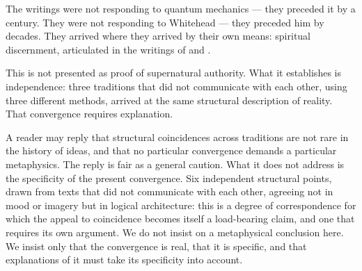 
The \bahai writings were not responding to quantum mechanics --- they
preceded it by a century.
They were not responding to Whitehead --- they preceded him by decades.
They arrived where they arrived by their own means: spiritual discernment,
articulated in the writings of \Bahaullah and \AbdulBaha.

This is not presented as proof of supernatural authority.
What it establishes is independence: three traditions that did not communicate
with each other, using three different methods, arrived at the same structural
description of reality.
That convergence requires explanation.

A reader may reply that structural coincidences across traditions are not rare
in the history of ideas, and that no particular convergence demands a
particular metaphysics.
The reply is fair as a general caution.
What it does not address is the specificity of the present convergence.
Six independent structural points, drawn from texts that did not communicate
with each other, agreeing not in mood or imagery but in logical architecture:
this is a degree of correspondence for which the appeal to coincidence
becomes itself a load-bearing claim, and one that requires its own argument.
We do not insist on a metaphysical conclusion here.
We insist only that the convergence is real, that it is specific, and that
explanations of it must take its specificity into account.

